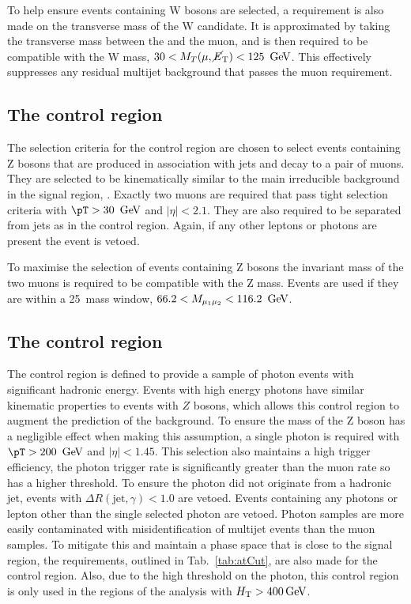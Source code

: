 To help ensure events containing W bosons are selected, a requirement
is also made on the transverse mass of the W candidate. It is
approximated by taking the transverse mass between the \MET and the
muon, and is then required to be compatible with the W mass,
$30<M_T(\mu,\mbox{$\cancel{E}_\text{T}$})<125~\mathrm{\,Ge\kern -0.1em V}$. This effectively suppresses any residual
\QCD multijet background that passes the muon requirement.

\subsection{The \mmj control region}

The selection criteria for the \mmj control region are chosen to
select events containing Z bosons that are produced in association
with jets and decay to a pair of muons. They are selected to be
kinematically similar to the main irreducible background in the signal
region, \znunu. Exactly two muons are required that
pass tight selection criteria with $\pT>30~\gev$ and $|\eta|<2.1$.
They are also required to be separated from jets as in the \mj control
region. Again, if any other leptons or photons are present the event
is vetoed.

To maximise the selection of events containing Z bosons the
invariant mass of the two muons is required to be compatible with the
Z mass. Events are used if they are within a 25~\gev mass window,
$66.2<M_{\mu_1\mu_2}<116.2~\mathrm{\,Ge\kern -0.1em V}$.

\subsection{The \gj control region}

The \gj control region is defined to provide a sample of photon events
with significant hadronic energy. Events with high energy photons have similar
kinematic properties to events with $Z$ bosons, which allows this control region
to augment the prediction of the \znunu background. To
ensure the mass of the Z boson has a negligible effect when making
this assumption, a single photon is required with $\pT>200~\gev$ and
$|\eta|<1.45$. This selection also maintains a high trigger
efficiency, the photon trigger rate is significantly greater than the
muon rate so has a higher \pT threshold. To ensure the photon did not
originate from a hadronic jet, events with $\Delta
R(\mathrm{jet},\gamma)<1.0$ are vetoed. Events containing any photons
or lepton other than the single selected photon are vetoed. Photon
samples are more easily contaminated with misidentification of \QCD
multijet events than the muon samples. To mitigate this and maintain a
phase space that is close to the signal region, the \alphat
requirements, outlined in Tab.~\ref{tab:atCut}, are also made for the \gj
control region. Also, due to the high \pT threshold on the photon,
this control region is only used in the regions of the analysis with
$\mbox{$H_\text{T}$}>400\mathrm{\,Ge\kern -0.1em V}$.

